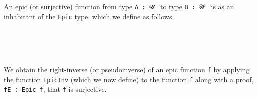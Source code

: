 An epic (or surjective) function from type \texttt{A\ :\ 𝓤\ ̇} to type
\texttt{B\ :\ 𝓦\ ̇} is as an inhabitant of the \texttt{Epic} type, which
we define as follows.

\begin{code}%
\>[0]\<%
\\
\>[0][@{}l@{\AgdaIndent{1}}]%
\>[1]\AgdaSpace{}%
\AgdaSymbol{:}\AgdaSpace{}%
\AgdaSymbol{\{}\AgdaSpace{}%
\AgdaSymbol{:}\AgdaSpace{}%
\AgdaSpace{}%
\AgdaSpace{}%
\AgdaSymbol{\}}\AgdaSpace{}%
\AgdaSymbol{\{}\AgdaSpace{}%
\AgdaSymbol{:}\AgdaSpace{}%
\AgdaSpace{}%
\AgdaSpace{}%
\AgdaSymbol{\}}\AgdaSpace{}%
\AgdaSymbol{(}\AgdaSpace{}%
\AgdaSymbol{:}\AgdaSpace{}%
\AgdaSpace{}%
\AgdaSpace{}%
\AgdaSymbol{)}\AgdaSpace{}%
%
\>[45]\AgdaSpace{}%
\AgdaSpace{}%
\AgdaSpace{}%
\<%
\\
%
\>[1]\AgdaSpace{}%
\AgdaSpace{}%
\AgdaSymbol{=}\AgdaSpace{}%
\AgdaSpace{}%
\AgdaSpace{}%
\AgdaSpace{}%
\AgdaSpace{}%
\AgdaSpace{}%
\AgdaSpace{}%
\<%
\\
\>[0]\<%
\end{code}

We obtain the right-inverse (or pseudoinverse) of an epic function
\texttt{f} by applying the function \texttt{EpicInv} (which we now
define) to the function \texttt{f} along with a proof,
\texttt{fE\ :\ Epic\ f}, that \texttt{f} is surjective.

